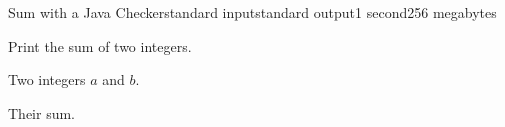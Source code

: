 \begin{problem}{Sum with a Java Checker}{standard input}{standard output}{1 second}{256 megabytes}

Print the sum of two integers.

\InputFile
Two integers $a$ and $b$.

\OutputFile
Their sum.

\Examples

%

\end{problem}
